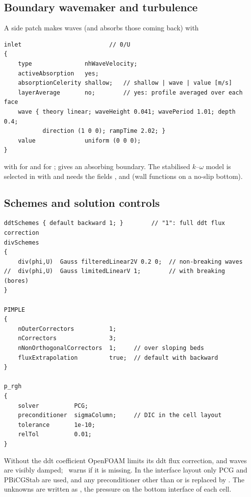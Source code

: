 \subsection{Boundary wavemaker and turbulence}

A side patch makes waves (and absorbs those coming back) with
\begin{verbatim}
inlet                         // 0/U
{
    type               nhWaveVelocity;
    activeAbsorption   yes;
    absorptionCelerity shallow;   // shallow | wave | value [m/s]
    layerAverage       no;        // yes: profile averaged over each face
    wave { theory linear; waveHeight 0.041; wavePeriod 1.01; depth 0.4;
           direction (1 0 0); rampTime 2.02; }
    value              uniform (0 0 0);
}
\end{verbatim}
with  for  and  for
;  gives an absorbing boundary. The stabilised
$k$--$\omega$ model is selected in  with
 and needs the fields
,  and  (wall functions on a no-slip bottom).

\subsection{Schemes and solution controls}

\begin{verbatim}
ddtSchemes { default backward 1; }        // "1": full ddt flux correction
divSchemes
{
    div(phi,U)  Gauss filteredLinear2V 0.2 0;  // non-breaking waves
//  div(phi,U)  Gauss limitedLinearV 1;        // with breaking (bores)
}

PIMPLE
{
    nOuterCorrectors          1;
    nCorrectors               3;
    nNonOrthogonalCorrectors  1;     // over sloping beds
    fluxExtrapolation         true;  // default with backward
}

p_rgh
{
    solver          PCG;
    preconditioner  sigmaColumn;     // DIC in the cell layout
    tolerance       1e-10;
    relTol          0.01;
}
\end{verbatim}

Without the ddt coefficient OpenFOAM limits its ddt flux correction, and waves
are visibly damped; \NHFOAM\ warns if it is missing. In the interface layout
only PCG and PBiCGStab are used, and any preconditioner other than
 or  is replaced by . The unknowns
are written as , the pressure on the bottom interface of each cell.


